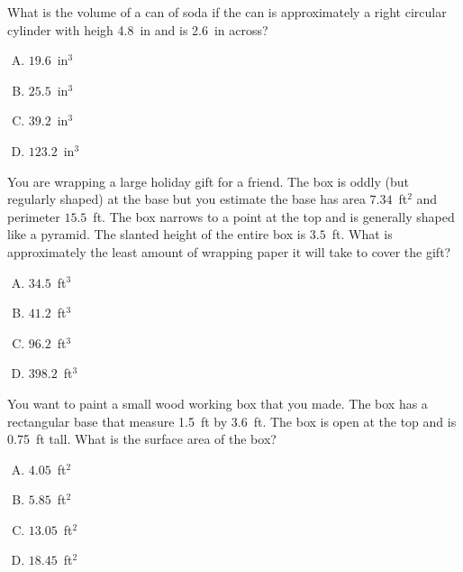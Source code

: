 \documentclass[12pt,letterpaper]{exam}
\begin{document}
\begin{questions}
\vfill



\question What is the volume of a can of soda if the can is approximately a right circular cylinder with heigh 4.8~in and is 2.6~in across?
        \begin{enumerate}[A.]
        \item $19.6$~in$^3$
        \item $25.5$~in$^3$ %
        \item $39.2$~in$^3$
        \item $123.2$~in$^3$
        \end{enumerate}



\newpage



\question You are wrapping a large holiday gift for a friend. The box is oddly (but regularly shaped) at the base but you estimate the base has area $7.34$~ft$^2$ and perimeter $15.5$~ft. The box narrows to a point at the top and is generally shaped like a pyramid. The slanted height of the entire box is $3.5$~ft. What is approximately the least amount of wrapping paper it will take to cover the gift?
        \begin{enumerate}[A.]
        \item $34.5$~ft$^3$
        \item $41.2$~ft$^3$
        \item $96.2$~ft$^3$ %
        \item $398.2$~ft$^3$
        \end{enumerate}



\vfill



\question You want to paint a small wood working box that you made. The box has a rectangular base that measure 1.5~ft by 3.6~ft. The box is open at the top and is 0.75~ft tall. What is the surface area of the box?
        \begin{enumerate}[A.]
        \item $4.05$~ft$^2$
        \item $5.85$~ft$^2$
        \item $13.05$~ft$^2$
        \item $18.45$~ft$^2$ %
        \end{enumerate}



\vfill




\end{questions}
\end{document}
